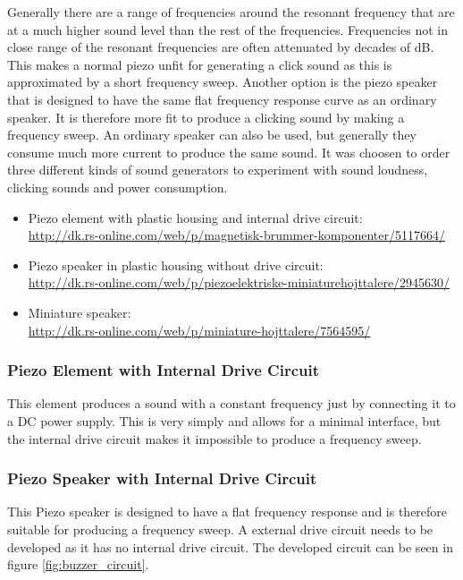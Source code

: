 Generally there are a range of frequencies around the resonant frequency that are at a much higher sound level than the rest of the frequencies.
Frequencies not in close range of the resonant frequencies are often attenuated by decades of dB.
This makes a normal piezo unfit for generating a click sound as this is approximated by a short frequency sweep.
Another option is the piezo speaker that is designed to have the same flat frequency response curve as an ordinary speaker.
It is therefore more fit to produce a clicking sound by making a frequency sweep.
An ordinary speaker can also be used, but generally they consume much more current to produce the same sound.
It was choosen to order three different kinds of sound generators to experiment with sound loudness, clicking sounds and power consumption.
\begin{itemize}
  \item Piezo element with plastic housing and internal drive circuit:\\
        \url{http://dk.rs-online.com/web/p/magnetisk-brummer-komponenter/5117664/}
  \item Piezo speaker in plastic housing without drive circuit: \\
        \url{http://dk.rs-online.com/web/p/piezoelektriske-miniaturehojttalere/2945630/}
  \item Miniature speaker:\\
          \url{http://dk.rs-online.com/web/p/miniature-hojttalere/7564595/}
\end{itemize}
\subsubsection*{Piezo Element with Internal Drive Circuit}
This element produces a sound with a constant frequency just by connecting it to a DC power supply. 
This is very simply and allows for a minimal interface, but the internal drive circuit makes it impossible to produce a frequency sweep. 

\subsubsection*{Piezo Speaker with Internal Drive Circuit}
This Piezo speaker is designed to have a flat frequency response and is therefore suitable for producing a frequency sweep. 
A external drive circuit needs to be developed as it has no internal drive circuit.
The developed circuit can be seen in figure \ref{fig:buzzer_circuit}.

